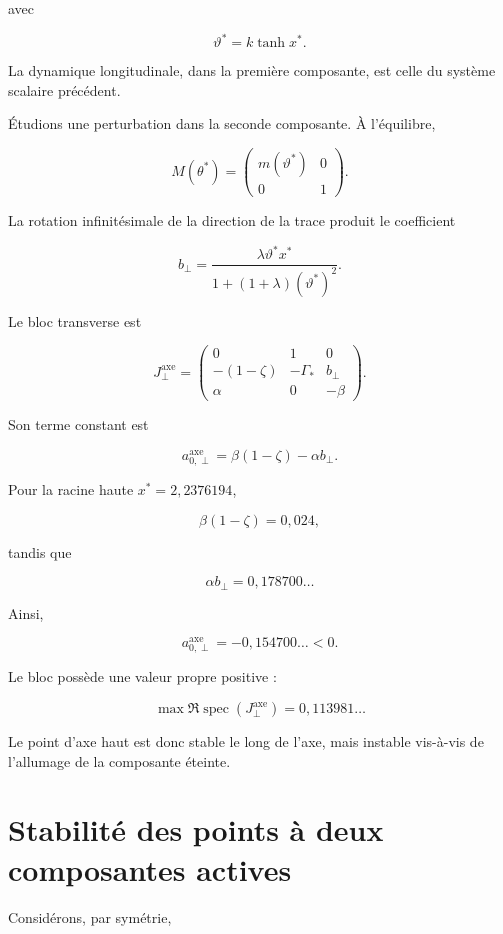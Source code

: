 avec

\[
\vartheta^\ast=k\tanh x^\ast.
\]

La dynamique longitudinale, dans la première composante, est celle du
système scalaire précédent.

Étudions une perturbation dans la seconde composante. À l'équilibre,

\[
M(\theta^\ast)
=
\begin{pmatrix}
m(\vartheta^\ast)&0\\
0&1
\end{pmatrix}.
\]

La rotation infinitésimale de la direction de la trace produit le
coefficient

\[
b_\perp
=
\frac{
\lambda\vartheta^\ast x^\ast
}{
1+(1+\lambda)(\vartheta^\ast)^2
}.
\]

Le bloc transverse est

\[
J_\perp^{\mathrm{axe}}
=
\begin{pmatrix}
0&1&0\\
-(1-\zeta)&-\Gamma_\ast&b_\perp\\
\alpha&0&-\beta
\end{pmatrix}.
\]

Son terme constant est

\[
\boxed{
a_{0,\perp}^{\mathrm{axe}}
=
\beta(1-\zeta)-\alpha b_\perp.
}
\]

Pour la racine haute \(x^\ast=2{,}2376194\),

\[
\beta(1-\zeta)=0{,}024,
\]

tandis que

\[
\alpha b_\perp
=
0{,}178700\ldots
\]

Ainsi,

\[
a_{0,\perp}^{\mathrm{axe}}
=
-0{,}154700\ldots<0.
\]

Le bloc possède une valeur propre positive :

\[
\max\Re\operatorname{spec}
\left(
J_\perp^{\mathrm{axe}}
\right)
=
0{,}113981\ldots
\]

Le point d'axe haut est donc stable le long de l'axe, mais instable
vis-à-vis de l'allumage de la composante éteinte.

\section{Stabilité des points à deux composantes actives}
\label{annexe-reduction-stabilite-diagonale}

Considérons, par symétrie,

